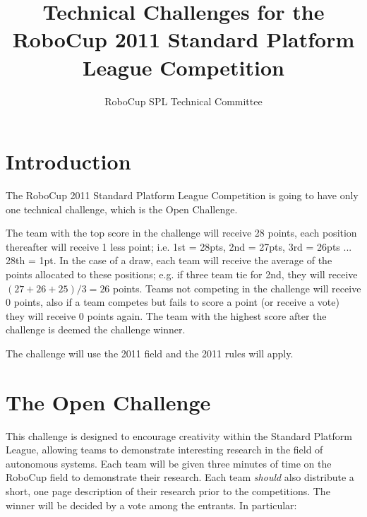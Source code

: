 \documentclass{article}
\begin{document}
\title{Technical Challenges for the RoboCup 2011 Standard Platform League Competition}

\author{RoboCup SPL Technical Committee}

\maketitle

\section{Introduction}
\label{sec:introduction}

The RoboCup 2011 Standard Platform League Competition is going to have only 
one technical challenge, which is the Open Challenge.

The team with the top score in the challenge will receive 28 points, each 
position thereafter will receive 1 less point; i.e. 1st = 28pts, 2nd = 27pts, 
3rd = 26pts ... 28th = 1pt. In the case of a draw, each team will receive 
the average of the points allocated to these positions; e.g. if three team 
tie for 2nd, they will receive $(27+26+25)/3 = 26$ points. Teams not competing 
in the challenge will receive 0 points, also if a team competes but fails to 
score a point (or receive a vote) they will receive 0 points again. The team 
with the highest score after the challenge is deemed the challenge winner.

The challenge will use the 2011 field and the 2011 rules will apply.


\section{The Open Challenge}
\label{sec:open}
\newcommand{\openMinNum}{three}

This challenge is designed to encourage creativity within the Standard 
Platform League, allowing teams to demonstrate interesting research in 
the field of autonomous systems. Each team will be given \openMinNum{} 
minutes of time on the RoboCup field to demonstrate their research. 
Each team \emph{should} also distribute a short, one page description of 
their research prior to the competitions. The winner will be decided by 
a vote among the entrants. In particular:
\end{document}
